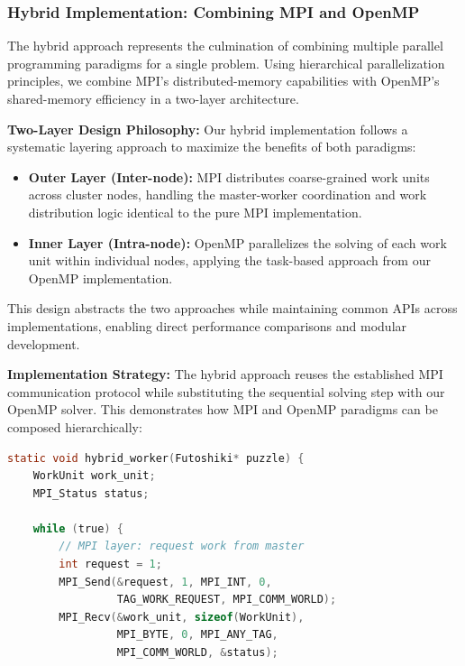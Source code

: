 \begin{enumerate}
\subsubsection{Hybrid Implementation: Combining MPI and OpenMP}
\label{subsubsec:hybrid_implementation}

The hybrid approach represents the culmination of combining multiple parallel programming paradigms for a single problem. Using hierarchical parallelization principles, we combine MPI's distributed-memory capabilities with OpenMP's shared-memory efficiency in a two-layer architecture.

\textbf{Two-Layer Design Philosophy:}
Our hybrid implementation follows a systematic layering approach to maximize the benefits of both paradigms:

\begin{itemize}
    \item \textbf{Outer Layer (Inter-node):} MPI distributes coarse-grained work units across cluster nodes, handling the master-worker coordination and work distribution logic identical to the pure MPI implementation.
    \item \textbf{Inner Layer (Intra-node):} OpenMP parallelizes the solving of each work unit within individual nodes, applying the task-based approach from our OpenMP implementation.
\end{itemize}

This design abstracts the two approaches while maintaining common APIs across implementations, enabling direct performance comparisons and modular development.

\textbf{Implementation Strategy:}
The hybrid approach reuses the established MPI communication protocol while substituting the sequential solving step with our OpenMP solver. This demonstrates how MPI and OpenMP paradigms can be composed hierarchically:

\begin{lstlisting}[language=C, caption=Hybrid worker combining MPI and OpenMP, label={listing:hybrid_worker}]
static void hybrid_worker(Futoshiki* puzzle) {
    WorkUnit work_unit;
    MPI_Status status;
    
    while (true) {
        // MPI layer: request work from master
        int request = 1;
        MPI_Send(&request, 1, MPI_INT, 0, 
                 TAG_WORK_REQUEST, MPI_COMM_WORLD);
        MPI_Recv(&work_unit, sizeof(WorkUnit), 
                 MPI_BYTE, 0, MPI_ANY_TAG, 
                 MPI_COMM_WORLD, &status);
        

\end{lstlisting}
\end{enumerate}
